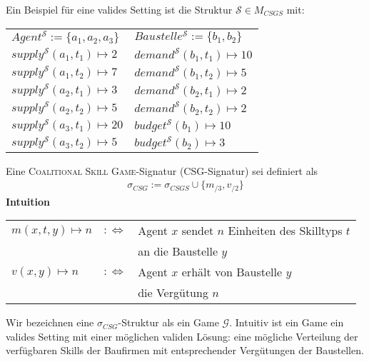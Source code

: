 \begin{bsp}[]
  Ein Beispiel für eine valides Setting ist die Struktur $\mathcal{S}\in M_{CSGS}$ mit:\\

  \setlength{\tabcolsep}{24pt}
  \begin{tabular}{l|l}
    $Agent^\mathcal{S} := \{a_1, a_2, a_3\}$ & $Baustelle^\mathcal{S} := \{b_1, b_2\}$ \\
    $supply^\mathcal{S}(a_1, t_1)\mapsto 2 $ & $demand^\mathcal{S}(b_1, t_1)\mapsto 10$\\
    $supply^\mathcal{S}(a_1, t_2)\mapsto 7 $ & $demand^\mathcal{S}(b_1, t_2)\mapsto 5 $\\
    $supply^\mathcal{S}(a_2, t_1)\mapsto 3 $ & $demand^\mathcal{S}(b_2, t_1)\mapsto 2 $\\
    $supply^\mathcal{S}(a_2, t_2)\mapsto 5 $ & $demand^\mathcal{S}(b_2, t_2)\mapsto 2 $\\
    $supply^\mathcal{S}(a_3, t_1)\mapsto 20$ & $budget^\mathcal{S}(b_1)\mapsto 10$\\
    $supply^\mathcal{S}(a_3, t_2)\mapsto 5 $ & $budget^\mathcal{S}(b_2)\mapsto 3 $\\
  \end{tabular}
\end{bsp}

\begin{definition}[CSG]
  Eine \textsc{Coalitional Skill Game}-Signatur (CSG-Signatur) sei definiert als
  \begin{align*}
    \sigma_{CSG}:=\sigma_{CSGS}\cup\{m_{/3}, v_{/2}\}
  \end{align*}
  \textbf{Intuition} \\
    \begin{tabular}{lrl}
    $m(x, t, y)\mapsto n$&$:\Leftrightarrow$& Agent $x$ sendet $n$ Einheiten des Skilltyps $t$ \\&& an die Baustelle $y$ \\
    $v(x,y)\mapsto n$&$:\Leftrightarrow$& Agent $x$ erhält von Baustelle $y$ \\&& die Vergütung $n$
    \end{tabular}
\end{definition}

Wir bezeichnen eine $\sigma_{CSG}$-Struktur als ein Game $\mathcal{G}$. Intuitiv ist ein Game ein valides Setting mit einer möglichen validen Lösung: eine mögliche Verteilung der verfügbaren Skills der Baufirmen mit entsprechender Vergütungen der Baustellen.

